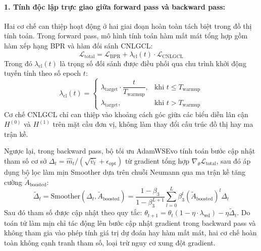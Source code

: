 \paragraph{1. Tính độc lập trực giao giữa forward pass và backward pass:}
Hai cơ chế can thiệp hoạt động ở hai giai đoạn hoàn toàn tách biệt trong đồ thị tính toán. Trong forward pass, mô hình tính toán hàm mất mát tổng hợp gồm hàm xếp hạng BPR và hàm đối sánh CNLGCL:
\begin{equation}
\mathcal{L}_{\text{total}} = \mathcal{L}_{\text{BPR}} + \lambda_{\text{cl}}(t) \cdot \mathcal{L}_{\text{CNLGCL}}
\end{equation}
Trong đó $\lambda_{\text{cl}}(t)$ là trọng số đối sánh được điều phối qua chu trình khởi động tuyến tính theo số epoch $t$:
\begin{equation}
\lambda_{\text{cl}}(t) = \begin{cases}
\lambda_{\text{target}} \cdot \dfrac{t}{T_{\text{warmup}}}, & \text{khi } t \le T_{\text{warmup}} \\[8pt]
\lambda_{\text{target}}, & \text{khi } t > T_{\text{warmup}}
\end{cases}
\end{equation}
Cơ chế CNLGCL chỉ can thiệp vào khoảng cách góc giữa các biểu diễn lân cận $H^{(0)}$ và $H^{(1)}$ trên mặt cầu đơn vị, không làm thay đổi cấu trúc đồ thị hay ma trận kề.

Ngược lại, trong backward pass, bộ tối ưu AdamWSEvo tính toán bước cập nhật tham số cơ sở $\Delta_t = \hat{m}_t / (\sqrt{\hat{v}_t} + \epsilon_{\text{opt}})$ từ gradient tổng hợp $\nabla_{\theta} \mathcal{L}_{\text{total}}$, sau đó áp dụng bộ lọc làm mịn Smoother dựa trên chuỗi Neumann qua ma trận kề tăng cường $\tilde{A}_{\text{boosted}}$:
\begin{equation}
\tilde{\Delta}_t = \text{Smoother}(\Delta_t, \tilde{A}_{\text{boosted}}) = \frac{1 - \beta_3}{1 - \beta_3^{L+1}} \sum_{l=0}^{L} \beta_3^l \left(\tilde{A}_{\text{boosted}}\right)^l \Delta_t
\end{equation}
Sau đó tham số được cập nhật theo quy tắc: $\theta_{t+1} = \theta_t (1 - \eta \cdot \lambda_{\text{wd}}) - \eta \tilde{\Delta}_t$. Do toán tử làm mịn chỉ tác động lên bước cập nhật gradient trong backward pass và không tham gia vào phép tính giá trị dự đoán hay hàm mất mát, hai cơ chế hoàn toàn không cạnh tranh tham số, loại trừ nguy cơ xung đột gradient.

